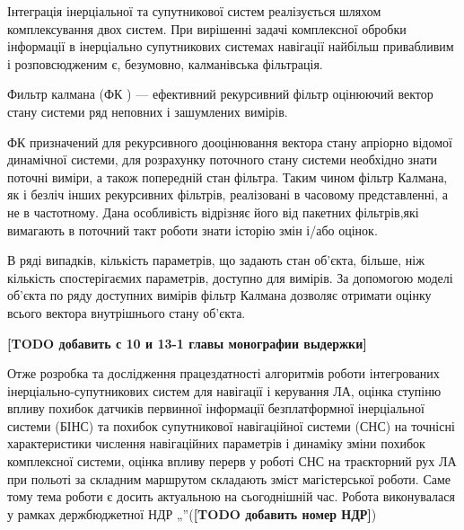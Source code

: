 Інтеграція інерціальної та супутникової систем реалізується шляхом комплексування двох
систем. При вирішенні задачі комплексної обробки інформації в інерціально супутникових
системах навігації найбільш привабливим і розповсюдженим є, безумовно, калманівська 
фільтрація.

Фильтр калмана (ФК ) --- ефективний рекурсивний фільтр оцінюючий вектор стану системи
ряд неповних і зашумлених вимірів.

ФК призначений для рекурсивного дооцінювання вектора стану апріорно відомої динамічної
системи, для розрахунку поточного стану системи необхідно знати поточні виміри, а
також попередній стан фільтра. Таким чином фільтр Калмана, як і безліч інших
рекурсивних фільтрів, реалізовані в часовому представленні, а не в частотному.
Дана особливість відрізняє його від пакетних фільтрів,які вимагають в поточний
такт роботи знати історію змін і/або оцінок.

В ряді випадків, кількість параметрів, що задають стан об'єкта, більше, ніж кількість
спостерігаємих параметрів, доступно для вимірів. За допомогою моделі об'єкта
по ряду доступних вимірів фільтр Калмана дозволяє отримати оцінку всього вектора
внутрішнього стану об'єкта. 

\textbf{[TODO  добавить с 10 и 13-1 главы монографии выдержки]}

Отже розробка та дослідження працездатності алгоритмів роботи інтегрованих 
інерціально-супутникових систем для навігації і керування ЛА, оцінка 
ступіню впливу похибок датчиків первинної інформації безплатформної 
інерціальної системи (БІНС) та похибок супутникової навігаційної системи 
(СНС) на точнісні характеристики числення навігаційних параметрів і динаміку 
зміни похибок комплексної системи, оцінка впливу перерв у роботі СНС на 
траєкторний рух ЛА при польоті за складним маршрутом складають зміст 
магістерської роботи. Саме тому тема роботи є досить актуальною на 
сьогоднішній час. Робота виконувалася у рамках держбюджетної 
НДР „”(\textbf{[TODO  добавить номер НДР]})